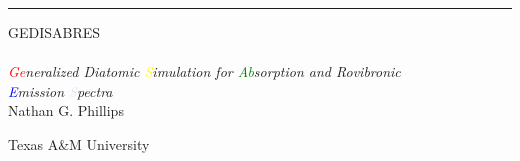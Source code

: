 \documentclass[11pt, twoside, fleqn]{report}
\begin{document}
\pagestyle{empty}

\begin{titlepage}

    \raggedleft

    \rule{1pt}{\textheight}
    \hspace{0.05\textwidth}
    \parbox[b]{0.75\textwidth}{

        {\Huge\textsc{GEDISABRES}}\\
        \\[2\baselineskip]
        {\large\textit{\textcolor{red}{Ge}neralized \textcolor{peach}{Di}atomic \textcolor{yellow}{S}imulation for \textcolor{green}{Ab}sorption and \textcolor{sky}{R}ovibronic \\ \textcolor{blue}{E}mission \textcolor{lavender}{S}pectra}}\\[4\baselineskip]
        {\large Nathan G. Phillips}

        \vspace{0.5\textheight}

        {\noindent Texas A\&M University}\\[\baselineskip]
    }

\end{titlepage}

\tableofcontents
\newpage
\listoffigures
\newpage
\listoftables
\newpage

\pagestyle{mystyle}





















\appendix





\printbibliography
{}
\end{document}
